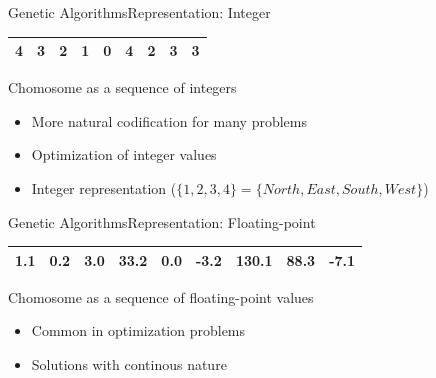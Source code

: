 \documentclass[10pt,compress]{beamer} %
\begin{document}
\begin{frame}{Genetic Algorithms}{Representation: Integer}
	\begin{table}[]
	\centering
	\begin{tabular}{|l|l|l|l|l|l|l|l|l|}
	\hline
 	4 & 3 & 2 & 1 & 0 & 4 & 2 & 3 & 3\\ \hline
	\end{tabular}
	\end{table}

	Chomosome as a sequence of integers
	\begin{itemize}
		\item More natural codification for many problems
		\item Optimization of integer values
		\item Integer representation ($\{1,2,3,4\}=\{North,East,South,West\}$)
  	\end{itemize}
\end{frame}

\begin{frame}{Genetic Algorithms}{Representation: Floating-point}
	\begin{table}[]
	\centering
	\begin{tabular}{|l|l|l|l|l|l|l|l|l|}
	\hline
 	1.1 & 0.2 & 3.0 & 33.2 & 0.0 & -3.2 & 130.1 & 88.3 & -7.1\\ \hline
	\end{tabular}
	\end{table}

	Chomosome as a sequence of floating-point values
	\begin{itemize}
		\item Common in optimization problems
		\item Solutions with continous nature
  	\end{itemize}
\end{frame}

\end{document}
